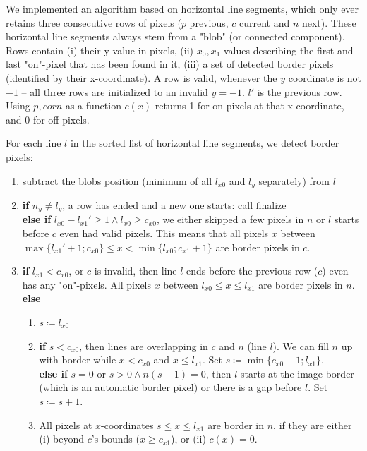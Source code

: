 \documentclass[9pt,lineno]{elife}
\begin{document}
\begin{appendixbox}
We implemented an algorithm based on horizontal line segments, which only ever retains three consecutive rows of pixels ($p$ previous, $c$ current and $n$ next). These horizontal line segments always stem from a "blob" (or connected component). Rows contain (i) their y-value in pixels, (ii) $x_0,x_1$ values describing the first and last "on"-pixel that has been found in it, (iii) a set of detected border pixels (identified by their x-coordinate). A row is valid, whenever the $y$ coordinate is not $-1$ -- all three rows are initialized to an invalid $y = -1$. $l'$ is the previous row. Using $p,c or n$ as a function $c(x)$ returns 1 for on-pixels at that x-coordinate, and 0 for off-pixels.

For each line $l$ in the sorted list of horizontal line segments, we detect border pixels:

\begin{enumerate}
    \item subtract the blobs position (minimum of all $l_{x0}$ and $l_y$ separately) from $l$
    \item \textbf{if} $n_y\not=l_y$, a row has ended and a new one starts: call finalize\\
    \textbf{else if} $l_{x0} - l_{x1}' \geq 1 \wedge l_{x0} \geq c_{x0}$, we either skipped a few pixels in $n$ or $l$ starts before $c$ even had valid pixels. This means that all pixels $x$ between $\max\{ l_{x1}'+1; c_{x0} \} \leq x < \min\{ l_{x0}; c_{x1}+1 \}$ are border pixels in $c$.
    
    \item \textbf{if} $l_{x1} < c_{x0}$, or $c$ is invalid, then line $l$ ends before the previous row ($c$) even has any "on"-pixels. All pixels $x$ between $l_{x0}\leq x \leq l_{x1}$ are border pixels in $n$.\\
    \textbf{else} 
    \begin{enumerate}
        \item $s\coloneqq l_{x0}$
        \item \textbf{if} $s < c_{x0}$, then lines are overlapping in $c$ and $n$ (line $l$). We can fill $n$ up with border while $x<c_{x0}$ and $x\leq l_{x1}$. Set $s\coloneqq \min\{ c_{x0}-1; l_{x1} \}$.\\
        \textbf{else if} $s = 0$ or $s > 0 \wedge n(s-1)=0$, then $l$ starts at the image border (which is an automatic border pixel) or there is a gap before $l$. Set $s\coloneqq s + 1$.
        \item All pixels at $x$-coordinates $s\leq x \leq l_{x1}$ are border in $n$, if they are either (i) beyond $c$'s bounds ($x \geq c_{x1}$), or (ii) $c(x) = 0$.
    \end{enumerate}
    

\end{enumerate}
\end{appendixbox}
\end{document}
